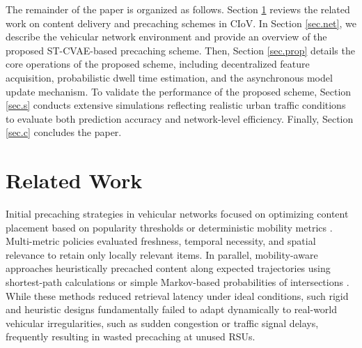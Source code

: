 \documentclass[journal]{IEEEtran}
\begin{document}
The remainder of the paper is organized as follows.
Section \ref{sec2} reviews the related work on content delivery and precaching schemes in CIoV.
In Section \ref{sec.net}, we describe the vehicular network environment and provide an overview of the proposed ST-CVAE-based precaching scheme.
Then, Section \ref{sec.prop} details the core operations of the proposed scheme, including decentralized feature acquisition, probabilistic dwell time estimation, and the asynchronous model update mechanism.
To validate the performance of the proposed scheme, Section \ref{sec.s} conducts extensive simulations reflecting realistic urban traffic conditions to evaluate both prediction accuracy and network-level efficiency.
Finally, Section \ref{sec.c} concludes the paper.

\section{Related Work} \label{sec2}
Initial precaching strategies in vehicular networks focused on optimizing content placement based on popularity thresholds or deterministic mobility metrics \cite{Ostrovskaya2018, Amadeo2021, Dua2019, Park2019}. 
Multi-metric policies evaluated freshness, temporal necessity, and spatial relevance to retain only locally relevant items. 
In parallel, mobility-aware approaches heuristically precached content along expected trajectories using shortest-path calculations or simple Markov-based probabilities of intersections \cite{Ahani2018, AlNagar2019, Liang2018, Grewe2018, Ikram2021}. 
While these methods reduced retrieval latency under ideal conditions, such rigid and heuristic designs fundamentally failed to adapt dynamically to real-world vehicular irregularities, such as sudden congestion or traffic signal delays, frequently resulting in wasted precaching at unused RSUs.
\end{document}
